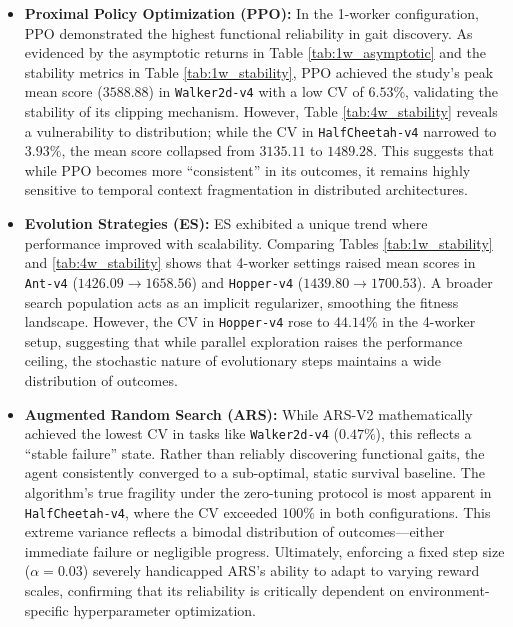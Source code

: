 \begin{itemize}
    \item \textbf{Proximal Policy Optimization (PPO):} In the 1-worker configuration, PPO demonstrated the highest functional reliability in gait discovery. As evidenced by the asymptotic returns in Table \ref{tab:1w_asymptotic} and the stability metrics in Table \ref{tab:1w_stability}, PPO achieved the study's peak mean score ($3588.88$) in \texttt{Walker2d-v4} with a low CV of $6.53\%$, validating the stability of its clipping mechanism. However, Table \ref{tab:4w_stability} reveals a vulnerability to distribution; while the CV in \texttt{HalfCheetah-v4} narrowed to $3.93\%$, the mean score collapsed from $3135.11$ to $1489.28$. This suggests that while PPO becomes more ``consistent'' in its outcomes, it remains highly sensitive to temporal context fragmentation in distributed architectures.
    
    \item \textbf{Evolution Strategies (ES):} ES exhibited a unique trend where performance improved with scalability. Comparing Tables \ref{tab:1w_stability} and \ref{tab:4w_stability} shows that 4-worker settings raised mean scores in \texttt{Ant-v4} ($1426.09 \to 1658.56$) and \texttt{Hopper-v4} ($1439.80 \to 1700.53$). A broader search population acts as an implicit regularizer, smoothing the fitness landscape. However, the CV in \texttt{Hopper-v4} rose to $44.14\%$ in the 4-worker setup, suggesting that while parallel exploration raises the performance ceiling, the stochastic nature of evolutionary steps maintains a wide distribution of outcomes.
    
    \item \textbf{Augmented Random Search (ARS):} While ARS-V2 mathematically achieved the lowest CV in tasks like \texttt{Walker2d-v4} ($0.47\%$), this reflects a ``stable failure'' state. Rather than reliably discovering functional gaits, the agent consistently converged to a sub-optimal, static survival baseline. The algorithm's true fragility under the zero-tuning protocol is most apparent in \texttt{HalfCheetah-v4}, where the CV exceeded $100\%$ in both configurations. This extreme variance reflects a bimodal distribution of outcomes—either immediate failure or negligible progress. Ultimately, enforcing a fixed step size ($\alpha = 0.03$) severely handicapped ARS's ability to adapt to varying reward scales, confirming that its reliability is critically dependent on environment-specific hyperparameter optimization.
\end{itemize}

